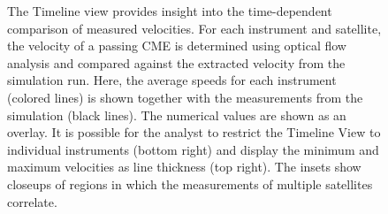 \documentclass[journal]{vgtc}                %
\begin{document}
\begin{figure}
{}
\caption{The Timeline view provides insight into the time-dependent comparison of measured velocities. For each instrument and satellite, the velocity of a passing CME is determined using optical flow analysis and compared against the extracted velocity from the simulation run. Here, the average speeds for each instrument (colored lines) is shown together with the measurements from the simulation (black lines). The numerical values are shown as an overlay. It is possible for the analyst to restrict the Timeline View to individual instruments (bottom right) and display the minimum and maximum velocities as line thickness (top right). The insets show closeups of regions in which the measurements of multiple satellites correlate.}
\label{fig:timeline}
\end{figure}

%
\end{document}
